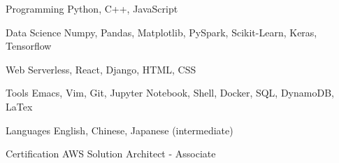 


\begin{cvskills}


\cvskill
{Programming}
{Python, C++, JavaScript}


\cvskill
{Data Science}
{Numpy, Pandas, Matplotlib, PySpark, Scikit-Learn, Keras, Tensorflow}


\cvskill
{Web}
{Serverless, React, Django, HTML, CSS}


\cvskill
{Tools}
{Emacs, Vim, Git, Jupyter Notebook, Shell, Docker, SQL, DynamoDB, LaTex}


\cvskill
{Languages}
{English, Chinese, Japanese (intermediate)}


\cvskill
{Certification}
{AWS Solution Architect - Associate}


\end{cvskills}